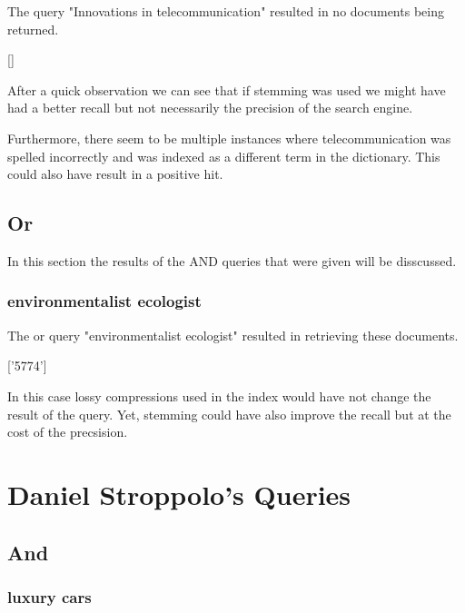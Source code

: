 \par The query "Innovations in telecommunication" resulted in no documents being returned.
\begin{center}
    []
\end{center}

\par After a quick observation we can see that if stemming was used we might have had a better recall but not necessarily the precision of the search engine.

\par Furthermore, there seem to be multiple instances where telecommunication was spelled incorrectly and was indexed as a different term in the dictionary. This could also have result in a positive hit.

\subsection{Or}

\par In this section the results of the AND queries that were given will be disscussed.

\subsubsection{environmentalist ecologist}

\par The or query "environmentalist ecologist" resulted in retrieving these documents.
\begin{center}
    ['5774']
\end{center}

\par In this case lossy compressions used in the index would have not change the result of the query. Yet, stemming could have also improve the recall but at the cost of the precsision.

\section{Daniel Stroppolo's Queries}

\subsection{And}

\subsubsection{luxury cars}

